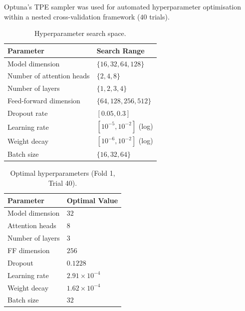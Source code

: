 \documentclass[conference]{IEEEtran}
\begin{document}
Optuna's TPE sampler was used for automated hyperparameter optimisation within a nested cross-validation framework ($40$ trials).

\begin{table}[H]
\centering
\caption{Hyperparameter search space.}
\label{tab:optuna_search}
\begin{tabular}{ll}
\toprule
\textbf{Parameter} & \textbf{Search Range} \\
\midrule
Model dimension              & $\{16, 32, 64, 128\}$     \\
Number of attention heads    & $\{2, 4, 8\}$             \\
Number of layers             & $\{1, 2, 3, 4\}$          \\
Feed-forward dimension       & $\{64, 128, 256, 512\}$   \\
Dropout rate                 & $[0.05, 0.3]$             \\
Learning rate                & $[10^{-5}, 10^{-2}]$ (log) \\
Weight decay                 & $[10^{-6}, 10^{-2}]$ (log) \\
Batch size                   & $\{16, 32, 64\}$          \\
\bottomrule
\end{tabular}
\end{table}

\begin{table}[H]
\centering
\caption{Optimal hyperparameters (Fold 1, Trial 40).}
\label{tab:optuna_best}
\begin{tabular}{ll}
\toprule
\textbf{Parameter} & \textbf{Optimal Value} \\
\midrule
Model dimension       & $32$             \\
Attention heads       & $8$              \\
Number of layers      & $3$              \\
FF dimension          & $256$            \\
Dropout               & $0.1228$         \\
Learning rate         & $2.91 \times 10^{-4}$  \\
Weight decay          & $1.62 \times 10^{-4}$  \\
Batch size            & $32$             \\
\bottomrule
\end{tabular}
\end{table}
\end{document}
